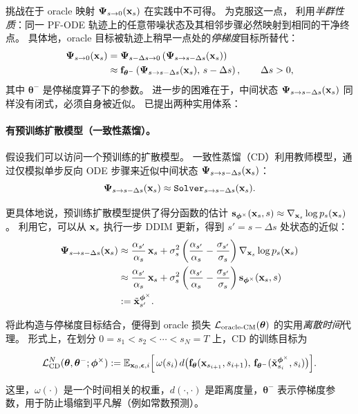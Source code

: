 挑战在于 oracle 映射 ${\bm{\Psi}}_{s\to 0}({\mathbf{x}}_s)$ 在实践中不可得。
为克服这一点，\citet{song2023consistency} 利用\emph{半群性质}：同一 PF-ODE 轨迹上的任意带噪状态及其相邻步骤必然映射到相同的干净终点。
具体地，oracle 目标被轨迹上稍早一点处的\emph{停梯度}目标所替代：
\begin{align*}
    {\bm{\Psi}}_{s\to 0}({\mathbf{x}}_s)
    &= {\bm{\Psi}}_{s-\Delta s \to 0} \left({\bm{\Psi}}_{s\to s-\Delta s}({\mathbf{x}}_s)\right) \\
    &\approx {\mathbf{f}}_{{\bm{\theta}}^-} \left({\bm{\Psi}}_{s\to s-\Delta s}({\mathbf{x}}_s),\,s-\Delta s\right),
    \qquad \Delta s > 0,
\end{align*}
其中 $\bm{\theta}^-$ 是停梯度算子下的参数。
进一步的困难在于，中间状态 ${\bm{\Psi}}_{s\to s-\Delta s}({\mathbf{x}}_s)$ 同样没有闭式，必须自身被近似。
已提出两种实用体系：

\paragraph{有预训练扩散模型（一致性蒸馏）。}
假设我们可以访问一个预训练的扩散模型。
一致性蒸馏（CD）利用教师模型，通过仅模拟单步反向 ODE 步骤来近似中间状态 ${\bm{\Psi}}_{s\to s-\Delta s}({\mathbf{x}}_s)$：
\[
 {\bm{\Psi}}_{s\to s-\Delta s}({\mathbf{x}}_s)  \approx  \mathtt{Solver}_{s \to s-\Delta s}({\mathbf{x}}_s).
\]

更具体地说，预训练扩散模型提供了得分函数的估计
${\mathbf{s}}_{\bm{\phi}^\times}({\mathbf{x}}_s, s) \approx \nabla_{{\mathbf{x}}_s}\log p_s({\mathbf{x}}_s)$。
利用它，可以从 ${\mathbf{x}}_s$ 执行一步 DDIM 更新，得到 $s' = s-\Delta s$ 处状态的近似：
\begin{align*}
    {\bm{\Psi}}_{s\to s-\Delta s}({\mathbf{x}}_s) 
    &\approx \frac{\alpha_{s'}}{\alpha_s}\,{\mathbf{x}}_s 
    + \sigma_s^2 \left( \frac{\alpha_{s'}}{\alpha_s} - \frac{\sigma_{s'}}{\sigma_s} \right)\nabla_{{\mathbf{x}}_s}\log p_s({\mathbf{x}}_s) \\
    &\approx \frac{\alpha_{s'}}{\alpha_s}\,{\mathbf{x}}_s 
    + \sigma_s^2 \left( \frac{\alpha_{s'}}{\alpha_s} - \frac{\sigma_{s'}}{\sigma_s} \right){\mathbf{s}}_{\bm{\phi}^\times}({\mathbf{x}}_s, s) \\
    &:= \tilde{{\mathbf{x}}}_{s'}^{\bm{\phi}^\times}.
\end{align*}

将此构造与停梯度目标结合，便得到 oracle 损失 $\mathcal{L}_{\mathrm{oracle}\text{-}\mathrm{CM}}({\bm{\theta}})$ 的实用\emph{离散时间}代理。
形式上，在划分 $0 = s_1 < s_2 < \cdots < s_N = T$ 上，CD 的训练目标为
\begin{mdframed}
\begin{align}\label{eq:cd-discrete-approx-N}
    \mathcal{L}_{\text{CD}}^N(\bm{\theta}, \bm{\theta}^-; \bm{\phi}^\times)
    := \mathbb{E}_{{\mathbf{x}}_0, {\bm{\epsilon}}, i} \Big[\, \omega(s_i)\,
    d\big({\mathbf{f}}_{\bm{\theta}}({\mathbf{x}}_{s_{i+1}}, s_{i+1}),\,
          {\mathbf{f}}_{\bm{\theta}^-}(\tilde{{\mathbf{x}}}_{s_i}^{\bm{\phi}^\times}, s_i)\big)\Big].
\end{align}
\end{mdframed}
这里，$\omega(\cdot)$ 是一个时间相关的权重，$d(\cdot,\cdot)$ 是距离度量，$\bm{\theta}^-$ 表示停梯度参数，用于防止塌缩到平凡解（例如常数预测）。



